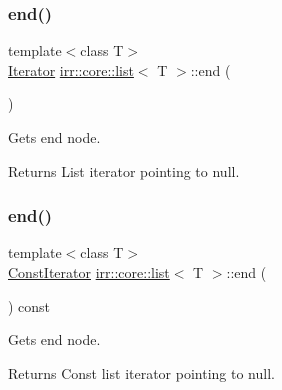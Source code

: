 \subsubsection{\texorpdfstring{end()}{end()}\hspace{0.1cm}{\footnotesize\ttfamily [1/2]}}
{\footnotesize\ttfamily template$<$class T$>$ \\
\hyperlink{classirr_1_1core_1_1list_1_1Iterator}{Iterator} \hyperlink{classirr_1_1core_1_1list}{irr\+::core\+::list}$<$ T $>$\+::end (\begin{DoxyParamCaption}{ }\end{DoxyParamCaption})\hspace{0.3cm}{\ttfamily [inline]}}



Gets end node. 

\begin{DoxyReturn}{Returns}
List iterator pointing to null. 
\end{DoxyReturn}
\mbox{\label{classirr_1_1core_1_1list_a6209ac37decfb5f29da921ea40b46e10}} 
\subsubsection{\texorpdfstring{end()}{end()}\hspace{0.1cm}{\footnotesize\ttfamily [2/2]}}
{\footnotesize\ttfamily template$<$class T$>$ \\
\hyperlink{classirr_1_1core_1_1list_1_1ConstIterator}{Const\+Iterator} \hyperlink{classirr_1_1core_1_1list}{irr\+::core\+::list}$<$ T $>$\+::end (\begin{DoxyParamCaption}{ }\end{DoxyParamCaption}) const\hspace{0.3cm}{\ttfamily [inline]}}



Gets end node. 

\begin{DoxyReturn}{Returns}
Const list iterator pointing to null. 
\end{DoxyReturn}
\mbox{\label{classirr_1_1core_1_1list_a407935fc79a35ce7caa19e4f6ce25c3f}} 

